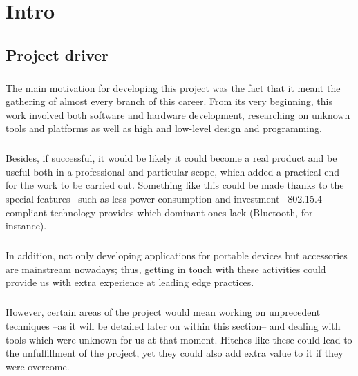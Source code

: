 \chapter{Intro}
\label{cha:intro}
	\section{Project driver}
		\paragraph{}
		The main motivation for developing this project was the fact that it meant
		the gathering of almost every branch of this career. From its very beginning, this
		work involved both software and hardware development, researching on unknown 
		tools and platforms as well as high and low-level design and programming.
		
		\paragraph{}
		Besides, if successful, it would be likely it could become a real product
		and be useful both in a professional and particular scope, which added a practical
		end for the work to be carried out. Something like this could be made thanks to
		the special features --such as less power consumption and investment-- 802.15.4-compliant
		technology provides which dominant ones lack (Bluetooth, for instance).
		
		\paragraph{}
		In addition, not only developing applications for portable devices but accessories
		are mainstream nowadays; thus, getting in touch with these activities could
		provide us with extra experience at leading edge practices.
		
		\paragraph{}
		However, certain areas of the project would mean working on unprecedent techniques
		--as it will be detailed later on within this section-- and dealing with tools
		which were unknown for us at that moment. Hitches like these could lead to the
		unfulfillment of the project, yet they could also add extra value to it if 
		they were overcome.		
		
